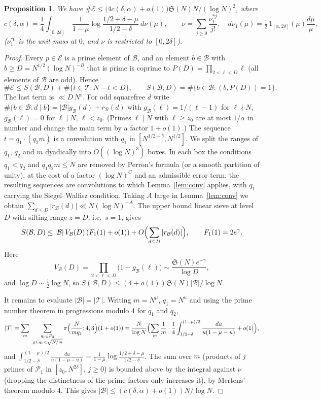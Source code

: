 \documentclass[11pt]{amsart}
\newtheorem{proposition}[theorem]{Proposition}
\theoremstyle{remark}
\newcommand{\cB}{\mathcal{B}}
\newcommand{\cE}{\mathcal{E}}
\newcommand{\cP}{\mathcal{P}}
\newcommand{\cT}{\mathcal{T}}
\newcommand{\Sg}{\mathfrak{S}}
\begin{document}
\begin{proposition}\label{prop:switch}
We have $\#\cE\le\bigl(4c(\delta,\alpha)+o(1)\bigr)\Sg(N)N/(\log N)^2$, where
\[
c(\delta,\alpha)=\frac14\int_{[0,2\delta]}\ \frac{1}{1-\mu}\log\frac{1/2+\delta-\mu}{1/2-\delta}\ d\nu(\mu),
\qquad
\nu=\sum_{j\ge0}\frac{\nu_1^{*j}}{j!},\quad d\nu_1(\mu)=\tfrac12\,1_{[\alpha,2\delta]}(\mu)\frac{d\mu}{\mu},
\]
($\nu_1^{*0}$ is the unit mass at $0$, and $\nu$ is restricted to $[0,2\delta]$).
\end{proposition}

\begin{proof}
Every $p\in\cE$ is a prime element of $\cB$, and an element $b\in\cB$ with $b\ge D=N^{1/2}(\log N)^{-B}$
that is prime is coprime to $P(D)=\prod_{2<\ell<D}\ell$ (all elements of $\cB$ are odd). Hence
\[
\#\cE\le S(\cB,D)+\#\{t\in\cT:N-t<D\},\qquad S(\cB,D)=\#\{b\in\cB:(b,P(D))=1\}.
\]
The last term is $\ll D\,N^{\varepsilon}$. For odd squarefree $d$ write
$\#\{b\in\cB:d\mid b\}=|\cB|g_\cB(d)+r_\cB(d)$ with $g_\cB(\ell)=1/(\ell-1)$ for $\ell\nmid N$, $g_\cB(\ell)=0$
for $\ell\mid N$, $\ell<z_0$. (Primes $\ell\mid N$ with $\ell\ge z_0$ are at most $1/\alpha$ in number and
change the main term by a factor $1+o(1)$.) The sequence $t=q_1\cdot(q_2m)$ is a convolution with $q_1$
in $[N^{1/2-\delta},N^{1/2}]$. We split the ranges of $q_1$, $q_2$ and $m$ dyadically into
$O((\log N)^3)$ boxes. In each box the conditions $q_1<q_2$ and $q_1q_2m\le N$ are removed by Perron's
formula (or a smooth partition of unity), at the cost of a factor $(\log N)^{C}$ and an admissible error
term; the resulting sequences are convolutions to which Lemma~\ref{lem:conv} applies, with
$q_1$ carrying the Siegel--Walfisz condition. Taking $A$ large in Lemma~\ref{lem:conv} we obtain
$\sum_{d\le D}|r_\cB(d)|\ll N(\log N)^{-A}$.
The upper bound linear sieve at level $D$ with sifting range $z=D$, i.e.\ $s=1$, gives
\[
S(\cB,D)\le|\cB|\,V_\cB(D)\,(F_1(1)+o(1))+O\Bigl(\sum_{d\le D}|r_\cB(d)|\Bigr),\qquad F_1(1)=2e^{\gamma}.
\]
Here
\[
V_\cB(D)=\prod_{2<\ell<D}\bigl(1-g_\cB(\ell)\bigr)\sim\frac{\Sg(N)e^{-\gamma}}{\log D},
\]
and $\log D\sim\frac12\log N$, so $S(\cB,D)\le(4+o(1))\Sg(N)|\cB|/\log N$.

It remains to evaluate $|\cB|=|\cT|$. Writing $m=N^{\mu}$, $q_1=N^{u}$ and using the prime number
theorem in progressions modulo 4 for $q_1$ and $q_2$,
\[
|\cT|=\sum_m\ \sum_{\substack{q_1\in\cP_3\\ y\le q_1<\sqrt{N/m}}}\pi\Bigl(\frac{N}{mq_1};4,3\Bigr)(1+o(1))
=\frac{N}{\log N}\Bigl(\sum_m\frac1m\cdot\frac14\int_{1/2-\delta}^{(1-\mu)/2}\frac{du}{u(1-\mu-u)}+o(1)\Bigr),
\]
and $\int_{1/2-\delta}^{(1-\mu)/2}\frac{du}{u(1-\mu-u)}=\frac{1}{1-\mu}\log\frac{1/2+\delta-\mu}{1/2-\delta}$.
The sum over $m$ (products of $j$ primes of $\cP_1$ in $[z_0,N^{2\delta}]$, $j\ge0$) is bounded above by
the integral against $\nu$ (dropping the distinctness of the prime factors only increases it), by
Mertens' theorem modulo 4. This gives $|\cB|\le(c(\delta,\alpha)+o(1))N/\log N$.
\end{proof}
\end{document}
